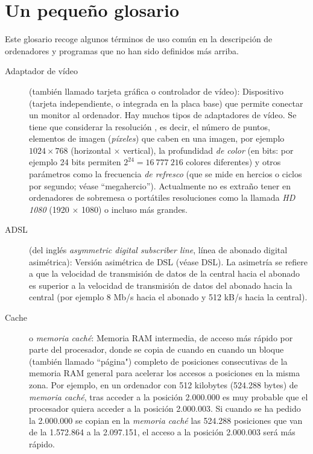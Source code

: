 \section{Un pequeño glosario} \label{ss:OiPgloss} Este glosario recoge algunos términos de uso común en la descripción de ordenadores y programas que no han sido definidos más arriba. 

\begin{description} \item[Adaptador de vídeo] (también llamado tarjeta gráfica o controlador de vídeo): Dispositivo (tarjeta independiente, o integrada en la placa base) que permite conectar un monitor al ordenador. Hay muchos tipos de adaptadores de vídeo. Se tiene que considerar la resolución \emph{}, es decir, el número de puntos, elementos de imagen (\emph{píxeles}) que caben en una imagen, por ejemplo $1024 \times768$ (horizontal $\times$ vertical), la profundidad \emph{de color} (en bits: por ejemplo 24 bits permiten $2^{24}=16~777~216$ colores diferentes) y otros parámetros como la frecuencia {\em de refresco} (que se mide en hercios o ciclos por segundo; véase ``megahercio''). Actualmente no es extraño tener en ordenadores de sobremesa o portátiles resoluciones como la llamada \emph{HD 1080} (1920 $\times$ 1080) o incluso más grandes. 

\item[ADSL] (del inglés \emph{asymmetric digital subscriber line}, línea de abonado digital asimétrica): Versión asimétrica de DSL (véase DSL). La asimetría se refiere a que la velocidad de transmisión de datos de la central hacia el abonado es superior a la velocidad de transmisión de datos del abonado hacia la central (por ejemplo 8 Mb/s hacia el abonado y 512 kB/s hacia la central). 

\item[Cache] o \emph{memoria caché}: Memoria RAM intermedia, de acceso más rápido por parte del procesador, donde se copia de cuando en cuando un bloque (también llamado ``página") completo de posiciones consecutivas de la memoria RAM general para acelerar los accesos a posiciones en la misma zona. Por ejemplo, en un ordenador con 512 kilobytes (524.288 bytes) de \emph{memoria caché}, tras acceder a la posición 2.000.000 es muy probable que el procesador quiera acceder a la posición 2.000.003. Si cuando se ha pedido la 2.000.000 se copian en la \emph{memoria caché} las 524.288 posiciones que van de la 1.572.864 a la 2.097.151, el acceso a la posición 2.000.003 será más rápido. 


\end{description}
